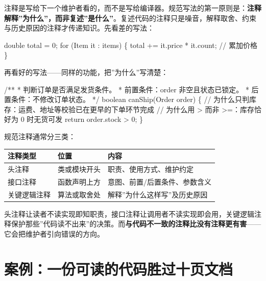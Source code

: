 \documentclass[12pt,a4paper,twoside,openany]{ctexbook}
\numberwithin{figure}{chapter}
\numberwithin{table}{chapter}
\newenvironment{Shaded}{}{}
\newcommand{\NormalTok}[1]{#1}
\newcounter{none}
\begin{document}
注释是写给下一个维护者看的，而不是写给编译器。规范写法的第一原则是：\textbf{注释解释''为什么''，而非复述''是什么''}。复述代码的注释只是噪音，解释取舍、约束与历史原因的注释才传递知识。先看差的写法：

\begin{Shaded}
\begin{Highlighting}[]
\NormalTok{double total = 0;}
\NormalTok{for (Item it : items) \{}
\NormalTok{    total += it.price * it.count;   // 累加价格}
\NormalTok{\}}
\end{Highlighting}
\end{Shaded}

再看好的写法------同样的功能，把''为什么''写清楚：

\begin{Shaded}
\begin{Highlighting}[]
\NormalTok{/**}
\NormalTok{ * 判断订单是否满足发货条件。}
\NormalTok{ * 前置条件：order 非空且状态已锁定。}
\NormalTok{ * 后置条件：不修改订单状态。}
\NormalTok{ */}
\NormalTok{boolean canShip(Order order) \{}
\NormalTok{    // 为什么只判库存：运费、地址等校验已在更早的下单环节完成}
\NormalTok{    // 为什么用 \textgreater{} 而非 \textgreater{}=：库存恰好为 0 时无货可发}
\NormalTok{    return order.stock \textgreater{} 0;}
\NormalTok{\}}
\end{Highlighting}
\end{Shaded}

规范注释通常分三类：

{\def\LTcaptype{none} %
\begin{longtable}[]{@{}lll@{}}
\toprule\noalign{}
注释类型 & 位置 & 内容 \\
\midrule\noalign{}
\endhead
\bottomrule\noalign{}
\endlastfoot
头注释 & 类或模块开头 & 职责、使用方式、维护约定 \\
接口注释 & 函数声明上方 & 意图、前置/后置条件、参数含义 \\
关键逻辑注释 & 算法或取舍处 & 解释''为什么这样写''及历史原因 \\
\end{longtable}
}

头注释让读者不读实现即知职责，接口注释让调用者不读实现即会用，关键逻辑注释保护那些''代码读不出来''的决策。而\textbf{与代码不一致的注释比没有注释更有害}------它会把维护者引向错误的方向。

\section{案例：一份可读的代码胜过十页文档}\label{ux6848ux4f8bux4e00ux4efdux53efux8bfbux7684ux4ee3ux7801ux80dcux8fc7ux5341ux9875ux6587ux6863}
\end{document}
